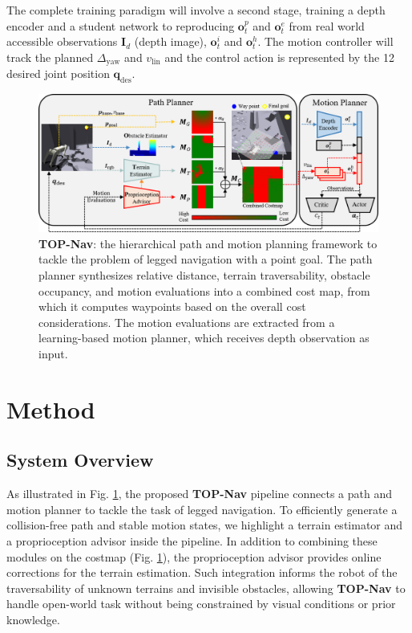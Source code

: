 \documentclass[conference]{IEEEtran}
\begin{document}
{The complete training paradigm will involve a second stage, training a depth encoder and a student network to reproducing ${\bm{o}_t^p}$ and ${\bm{o}_t^e}$ from real world accessible observations $\bm{I}_d$ (depth image), $\bm{o}_t^i$ and $\bm{o}_t^h$. The motion controller will track the planned $\Delta_\textrm{yaw}$ and $v_\textrm{lin}$ and the control action is represented by the 12 desired joint position $\bm{q}_\textrm{des}$.}

\begin{figure}[!h]
\centerline{\includegraphics[width=16.6cm]{figures/framework.pdf}}
\caption{ \textbf{TOP-Nav}: the hierarchical path and motion planning framework to tackle the problem of legged navigation with a point goal. The path planner synthesizes relative distance, terrain traversability, obstacle occupancy, and motion evaluations into a combined cost map, from which it computes waypoints based on the overall cost considerations. The motion evaluations are extracted from a learning-based motion planner, which receives depth observation as input.}
\label{framework}
\end{figure}

\section{{Method}}
\subsection{{System Overview}}
As illustrated in Fig. \ref{framework}, the proposed \textbf{TOP-Nav} pipeline connects a path and motion planner to tackle the task of legged navigation. To efficiently generate a collision-free path and stable motion states, we highlight a terrain estimator and a proprioception advisor inside the pipeline. In addition to combining these modules on the costmap (Fig. \ref{framework}), the proprioception advisor provides online corrections for the terrain estimation. Such integration informs the robot of the traversability of unknown terrains and invisible obstacles, allowing \textbf{TOP-Nav} to handle open-world task without being constrained by visual conditions or prior knowledge.
\end{document}
